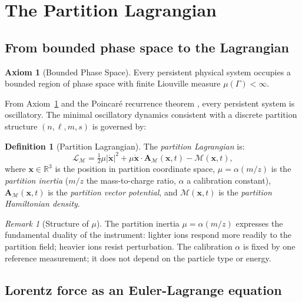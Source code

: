 \documentclass[twocolumn,10pt,a4paper]{article}
\theoremstyle{thmstyle}
\theoremstyle{definition}
\newtheorem{definition}[theorem]{Definition}
\newtheorem{axiom}{Axiom}
\theoremstyle{remark}
\newtheorem{remark}[theorem]{Remark}
\newcommand{\R}{\mathbb{R}}
\newcommand{\LM}{\mathcal{L}_{\mathcal{M}}}
\newcommand{\AM}{\mathbf{A}_{\mathcal{M}}}
\newcommand{\Mop}{\mathcal{M}}
\begin{document}
\section{The Partition Lagrangian}
\label{sec:lagrangian}

\subsection{From bounded phase space to the Lagrangian}

\begin{axiom}[Bounded Phase Space]
\label{ax:bps}
Every persistent physical system occupies a bounded region of phase space
with finite Liouville measure $\mu(\Gamma) < \infty$.
\end{axiom}

From Axiom~\ref{ax:bps} and the Poincar\'e recurrence theorem
\citep{poincare1890}, every persistent system is oscillatory. The minimal
oscillatory dynamics consistent with a discrete partition structure
$(n,\ell,m,s)$ is governed by:

\begin{definition}[Partition Lagrangian]
\label{def:lagrangian}
The \emph{partition Lagrangian} is:
\begin{equation}
\LM = \tfrac{1}{2}\mu|\dot{\mathbf{x}}|^2
+ \mu\dot{\mathbf{x}}\cdot\AM(\mathbf{x},t) - \Mop(\mathbf{x},t),
\label{eq:lagrangian}
\end{equation}
where $\mathbf{x} \in \R^3$ is the position in partition coordinate space,
$\mu = \alpha(m/z)$ is the \emph{partition inertia} ($m/z$ the
mass-to-charge ratio, $\alpha$ a calibration constant),
$\AM(\mathbf{x},t)$ is the \emph{partition vector potential},
and $\Mop(\mathbf{x},t)$ is the \emph{partition Hamiltonian density}.
\end{definition}

\begin{remark}[Structure of $\mu$]
The partition inertia $\mu = \alpha(m/z)$ expresses the fundamental
duality of the instrument: lighter ions respond more readily to the
partition field; heavier ions resist perturbation. The calibration $\alpha$
is fixed by one reference measurement; it does not depend on the particle
type or energy.
\end{remark}

\subsection{Lorentz force as an Euler-Lagrange equation}
\end{document}
